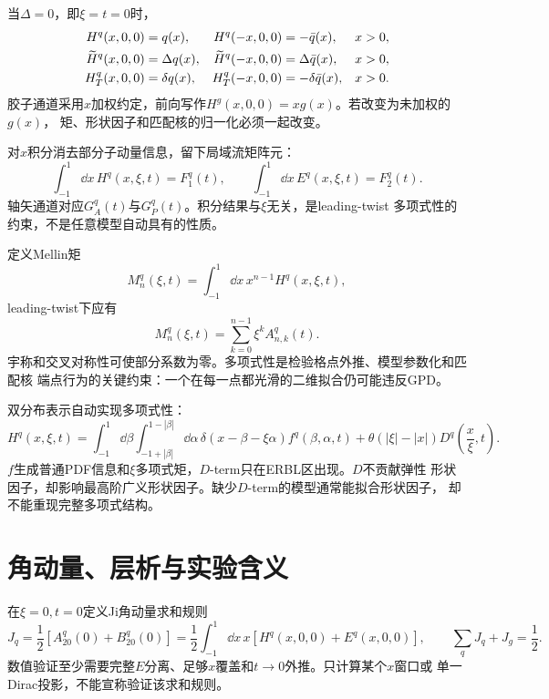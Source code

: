 当$\Delta=0$，即$\xi=t=0$时，
\begin{align}
  H^q(x,0,0)&=q(x),&
  H^q(-x,0,0)&=-\bar q(x),&x>0,\notag\\
  \widetilde H^q(x,0,0)&=\Delta q(x),&
  \widetilde H^q(-x,0,0)&=\Delta\bar q(x),&x>0,\notag\\
  H_T^q(x,0,0)&=\delta q(x),&
  H_T^q(-x,0,0)&=-\delta\bar q(x),&x>0.
  \label{eq:b04-gpd-forward}
\end{align}
胶子通道采用$x$加权约定，前向写作$H^g(x,0,0)=xg(x)$。若改变为未加权的$g(x)$，
矩、形状因子和匹配核的归一化必须一起改变。

对$x$积分消去部分子动量信息，留下局域流矩阵元：
\begin{equation}
  \int_{-1}^{1}\dd x\,H^q(x,\xi,t)=F_1^q(t),\qquad
  \int_{-1}^{1}\dd x\,E^q(x,\xi,t)=F_2^q(t).
  \label{eq:b04-gpd-formfactors}
\end{equation}
轴矢通道对应$G_A^q(t)$与$G_P^q(t)$。积分结果与$\xi$无关，是leading-twist
多项式性的约束，不是任意模型自动具有的性质。

定义Mellin矩
\begin{equation}
  M_n^q(\xi,t)=\int_{-1}^{1}\dd x\,x^{n-1}H^q(x,\xi,t),
  \label{eq:b04-gpd-mellin}
\end{equation}
leading-twist下应有
\begin{equation}
  M_n^q(\xi,t)=\sum_{k=0}^{n-1}\xi^kA_{n,k}^q(t).
  \label{eq:b04-gpd-polynomiality}
\end{equation}
宇称和交叉对称性可使部分系数为零。多项式性是检验格点外推、模型参数化和匹配核
端点行为的关键约束：一个在每一点都光滑的二维拟合仍可能违反GPD。

双分布表示自动实现多项式性：
\begin{equation}
  H^q(x,\xi,t)
  =\int_{-1}^{1}\dd\beta\int_{-1+|\beta|}^{1-|\beta|}\dd\alpha\,
  \delta(x-\beta-\xi\alpha)f^q(\beta,\alpha,t)
  +\theta(|\xi|-|x|)D^q\!\left(\frac{x}{\xi},t\right).
  \label{eq:b04-double-distribution}
\end{equation}
$f$生成普通PDF信息和$\xi$多项式矩，$D$-term只在ERBL区出现。$D$不贡献弹性
形状因子，却影响最高阶广义形状因子。缺少$D$-term的模型通常能拟合形状因子，
却不能重现完整多项式结构。

\section{角动量、层析与实验含义}

在$\xi=0,t=0$定义Ji角动量求和规则
\begin{equation}
  J_q=\frac12\left[A_{20}^q(0)+B_{20}^q(0)\right]
  =\frac12\int_{-1}^{1}\dd x\,x[H^q(x,0,0)+E^q(x,0,0)],
  \qquad
  \sum_qJ_q+J_g=\frac12 .
  \label{eq:b04-ji-sumrule}
\end{equation}
数值验证至少需要完整$E$分离、足够$x$覆盖和$t\to0$外推。只计算某个$x$窗口或
单一Dirac投影，不能宣称验证该求和规则。

